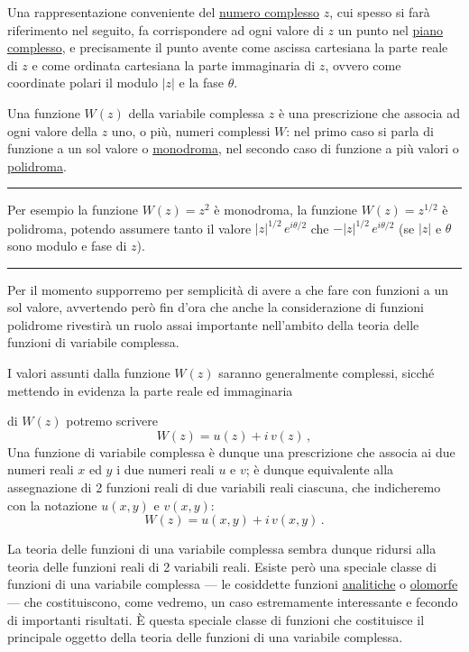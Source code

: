 \documentclass[11pt, a4paper]{book}
\numberwithin{equation}{section}
\begin{document}
Una rappresentazione conveniente del \uline{numero complesso} $z$, cui spesso si farà riferimento nel seguito, fa corrispondere ad ogni valore di $z$ un punto nel \uline{piano complesso}, e precisamente il punto avente come ascissa cartesiana la parte reale di $z$ e come ordinata cartesiana la parte immaginaria di $z$, ovvero come coordinate polari il modulo $|z|$ e la fase $\theta$.

Una funzione $W(z)$ della variabile complessa $z$ è una prescrizione che associa ad ogni valore della $z$ uno, o più, numeri complessi $W$: nel primo caso si parla di funzione a un sol valore o \uline{monodroma}, nel secondo caso di funzione a più valori o \uline{polidroma}.

\noindent\rule{\linewidth}{0.4pt}

Per esempio la funzione $W(z) = z^2$ è monodroma, la funzione $W(z) = z^{1/2}$ è polidroma, potendo assumere tanto il valore $|z|^{1/2}\,e^{i\theta/2}$ che $-|z|^{1/2}\,e^{i\theta/2}$ (se $|z|$ e $\theta$ sono modulo e fase di $z$).

\noindent\rule{\linewidth}{0.4pt}

Per il momento supporremo per semplicità di avere a che fare con funzioni a un sol valore, avvertendo però fin d'ora che anche la considerazione di funzioni polidrome rivestirà un ruolo assai importante nell'ambito della teoria delle funzioni di variabile complessa.

I valori assunti dalla funzione $W(z)$ saranno generalmente complessi, sicché mettendo in evidenza la parte reale ed immaginaria


di $W(z)$ potremo scrivere
\begin{equation}
W(z) = u(z) + i\,v(z)\,, \tag{3a}
\end{equation}
Una funzione di variabile complessa è dunque una prescrizione che associa ai due numeri reali $x$ ed $y$ i due numeri reali $u$ e $v$; è dunque equivalente alla assegnazione di 2 funzioni reali di due variabili reali ciascuna, che indicheremo con la notazione $u(x,y)$ e $v(x,y)$:
\begin{equation}
W(z) = u(x,y) + i\,v(x,y)\,. \tag{3b}
\end{equation}

La teoria delle funzioni di una variabile complessa sembra dunque ridursi alla teoria delle funzioni reali di 2 variabili reali. Esiste però una speciale classe di funzioni di una variabile complessa --- le cosiddette funzioni \uline{analitiche} o \uline{olomorfe} --- che costituiscono, come vedremo, un caso estremamente interessante e fecondo di importanti risultati. È questa speciale classe di funzioni che costituisce il principale oggetto della teoria delle funzioni di una variabile complessa.
\end{document}
